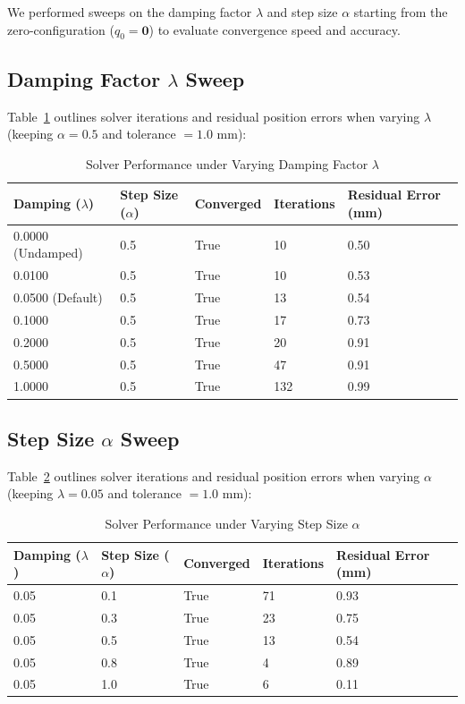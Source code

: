 \documentclass[12pt, a4paper]{article}
\begin{document}
We performed sweeps on the damping factor $\lambda$ and step size $\alpha$ starting from the zero-configuration ($q_0 = \mathbf{0}$) to evaluate convergence speed and accuracy.

\subsection{Damping Factor $\lambda$ Sweep}
Table~\ref{tab:lambda_sweep} outlines solver iterations and residual position errors when varying $\lambda$ (keeping $\alpha = 0.5$ and tolerance $= 1.0$ mm):

\begin{table}[H]
\centering
\begin{tabular}{lllll}
\toprule
\textbf{Damping ($\lambda$)} & \textbf{Step Size ($\alpha$)} & \textbf{Converged} & \textbf{Iterations} & \textbf{Residual Error (mm)} \\
\midrule
0.0000 (Undamped) & 0.5 & True & 10 & 0.50 \\
0.0100 & 0.5 & True & 10 & 0.53 \\
0.0500 (Default) & 0.5 & True & 13 & 0.54 \\
0.1000 & 0.5 & True & 17 & 0.73 \\
0.2000 & 0.5 & True & 20 & 0.91 \\
0.5000 & 0.5 & True & 47 & 0.91 \\
1.0000 & 0.5 & True & 132 & 0.99 \\
\bottomrule
\end{tabular}
\caption{Solver Performance under Varying Damping Factor $\lambda$}
\label{tab:lambda_sweep}
\end{table}

\subsection{Step Size $\alpha$ Sweep}
Table~\ref{tab:alpha_sweep} outlines solver iterations and residual position errors when varying $\alpha$ (keeping $\lambda = 0.05$ and tolerance $= 1.0$ mm):

\begin{table}[H]
\centering
\begin{tabular}{lllll}
\toprule
\textbf{Damping ($\lambda$)} & \textbf{Step Size ($\alpha$)} & \textbf{Converged} & \textbf{Iterations} & \textbf{Residual Error (mm)} \\
\midrule
0.05 & 0.1 & True & 71 & 0.93 \\
0.05 & 0.3 & True & 23 & 0.75 \\
0.05 & 0.5 & True & 13 & 0.54 \\
0.05 & 0.8 & True & 4 & 0.89 \\
0.05 & 1.0 & True & 6 & 0.11 \\
\bottomrule
\end{tabular}
\caption{Solver Performance under Varying Step Size $\alpha$}
\label{tab:alpha_sweep}
\end{table}
\end{document}
